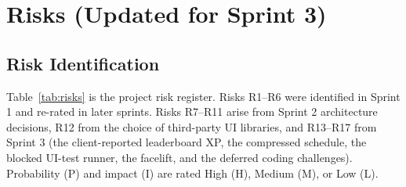 \documentclass[12pt,letterpaper]{article}
\begin{document}
\section{Risks (Updated for Sprint 3)}\label{sec:risks}

\subsection{Risk Identification}
Table~\ref{tab:risks} is the project risk register. Risks R1--R6 were identified in
Sprint 1 and re-rated in later sprints. Risks R7--R11 arise from Sprint 2 architecture
decisions, R12 from the choice of third-party UI libraries, and R13--R17 from Sprint 3
(the client-reported leaderboard XP, the compressed schedule, the blocked UI-test
runner, the facelift, and the deferred coding challenges). Probability (P) and impact (I) are rated High (H), Medium (M), or Low (L).
\end{document}

